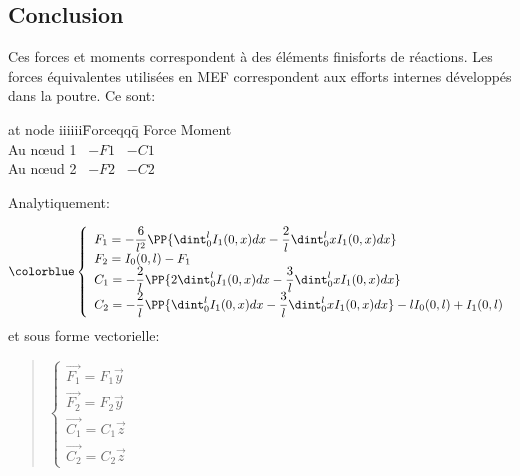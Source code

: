   \subsection{Conclusion}
\fi

Ces forces et moments correspondent à des éléments finisforts de réactions.
Les forces équivalentes utilisées en MEF correspondent aux efforts internes
développés dans la poutre. Ce sont:

\begin{tabbing}
  at node iiiiii\=Forceqqq\= \kill
       \>Force \>Moment\\
  Au nœud 1 \> ~$-F1$ \> ~$-C1$\\
  Au nœud 2 \> ~$-F2$ \> ~$-C2$\\
\end{tabbing}

Analytiquement:

\begin{equation}\colorblue
\label{Feq}\left\{
\begin{array}{l}
  F_1=-\dfrac 6{l^2}\PP{\dint_0^lI_1(0,x)dx-\dfrac 2l\dint_0^lxI_1(0,x)dx} \\
  F_2=I_0(0,l)-F_1 \\
  C_1=-\dfrac 2l\PP{2\dint_0^lI_1(0,x)dx-\dfrac3l\dint_0^lxI_1(0,x)dx} \\
  C_2=-\dfrac 2l\PP{\dint_0^lI_1(0,x)dx-\dfrac3l\dint_0^lxI_1(0,x)dx}
  -lI_0(0,l)+I_1(0,l)
\end{array}
\right.
\end{equation}
et sous forme vectorielle:

\begin{quotation}
$\left\{
\begin{array}{l}
  \overrightarrow{F_1}=F_1\overrightarrow{y} \\
  \overrightarrow{F_2}=F_2\overrightarrow{y} \\
  \overrightarrow{C_1}=C_1\overrightarrow{z} \\
  \overrightarrow{C_2}=C_2\overrightarrow{z}
\end{array}
\right.~$
\end{quotation}


